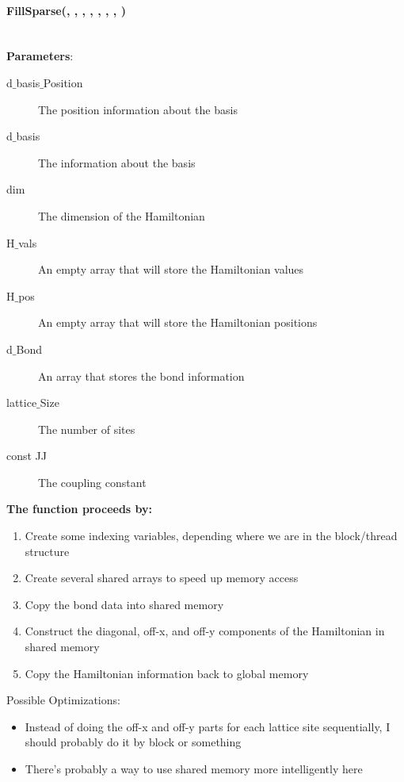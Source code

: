 \documentclass{article}
\begin{document}
\paragraph{\cudaglobal \void FillSparse(\typelongptr , \typelongptr , \int, \cuDoubleComplex , \typelongtwoptr , \int , \int , \const \double ) \\ \\ }
\noindent\textbf{Parameters}:
\begin{description}
\item[\typelongptr d$\_$basis$\_$Position] The position information about the basis
\item[\typelongptr d$\_$basis] The information about the basis
\item[\long dim] The dimension of the Hamiltonian
\item[\cuDoubleComplex H$\_$vals] An empty array that will store the Hamiltonian values
\item[\typelongtwoptr H$\_$pos] An empty array that will store the Hamiltonian positions
\item[\int d$\_$Bond] An array that stores the bond information
\item[\int lattice$\_$Size] The number of sites
\item[const \double JJ] The coupling constant
\end{description}

\noindent\textbf{The function proceeds by:}
\begin{enumerate}
\item{Create some indexing variables, depending where we are in the block/thread structure}
\item{Create several shared arrays to speed up memory access}
\item{Copy the bond data into shared memory}
\item{Construct the diagonal, off-x, and off-y components of the Hamiltonian in shared memory}
\item{Copy the Hamiltonian information back to global memory}
\end{enumerate}

Possible Optimizations:
\begin{itemize}
\item{Instead of doing the off-x and off-y parts for each lattice site sequentially, I should probably do it by block or something}
\item{There's probably a way to use shared memory more intelligently here}
\end{itemize}
\end{document}
